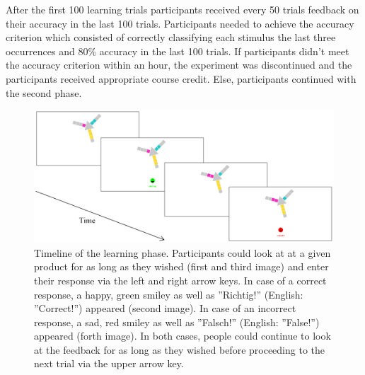 \documentclass[a4paper,man,natbib]{apa6}
\begin{document}
After the first 100 learning trials participants received every 50 trials feedback on their accuracy in the last 100 trials. Participants needed to achieve the accuracy criterion which consisted of correctly classifying each stimulus the last three occurrences and 80\% accuracy in the last 100 trials. If participants didn't meet the accuracy criterion within an hour, the experiment was discontinued and the participants received appropriate course credit. Else, participants continued with the second phase.

\begin{figure}[htbp]
\centering
\includegraphics[width = \textwidth]{fig_timeline.png}
\caption{Timeline of the learning phase. Participants could look at at a given product for as long as they wished (first and third image) and enter their response via the left and right arrow keys. In case of a correct response, a happy, green smiley as well as ''Richtig!'' (English: ''Correct!'') appeared (second image). In case of an incorrect response, a sad, red smiley as well as ''Falsch!'' (English: ''False!'') appeared (forth image). In both cases, people could continue to look at the feedback for as long as they wished before proceeding to the next trial via the upper arrow key.}
\label{fig:timeline}
\end{figure}
\end{document}
